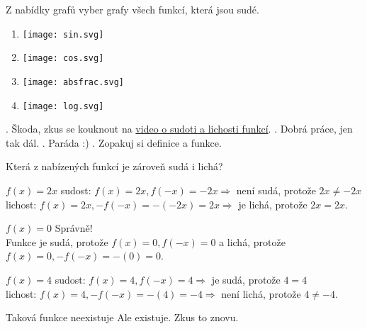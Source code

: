 \documentclass[language = czech]{webquiz}
\begin{document}
	\begin{question} \label{o3}
		Z nabídky grafů vyber grafy všech  funkcí, která jsou sudé.
			\begin{enumerate}
				\item \texttt{[image: sin.svg]} 
				\item  \texttt{[image: cos.svg]}
				\item \texttt{[image: absfrac.svg]}
				\item \texttt{[image: log.svg]} 
			\end{enumerate}
		
		\begin{choice}[multiple, columns=4]
			.  \feedback Škoda, zkus se kouknout na  \href{https://www.youtube.com/watch?v=6lFk55M3JXk}{video o sudoti a lichosti funkcí}.
			. \feedback Dobrá práce, jen tak dál.
			. \feedback Paráda :)
			. \feedback Zopakuj si definice  a  funkce.
		\end{choice}	
	\end{question}
	
	\begin{question} \label{o4}
		Která z nabízených funkcí je zároveň sudá i lichá?
		
		\begin{choice}
			
			\incorrect $f(x) = 2x$
				\feedback sudost: $f(x) = 2x, f(-x) = -2x \Rightarrow$ není sudá, protože $2x \neq -2x$\\ lichost: $f(x) = 2x, -f(-x) = -(-2x) = 2x \Rightarrow$ je lichá, protože $2x = 2x$.
			
			\correct $f(x) = 0$
				\feedback Správně!\\ Funkce je sudá, protože $f(x) = 0, f(-x) = 0$ a lichá, protože $f(x) = 0, -f(-x) = -(0) = 0$.
			
			\incorrect $f(x) = 4$
				\feedback sudost: $f(x) = 4, f(-x) = 4 \Rightarrow$ je sudá, protože $4 = 4$\\ lichost: $f(x) = 4, -f(-x) = -(4) = -4 \Rightarrow$ není lichá, protože $4 \neq -4$.
			
			\incorrect Taková funkce neexistuje
				\feedback Ale existuje. Zkus to znovu.
			
		\end{choice}	
	\end{question}
	
\end{document}
